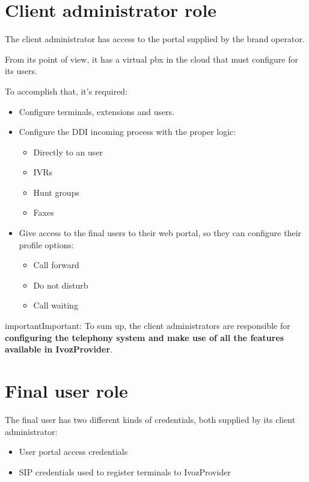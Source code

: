 \documentclass[letterpaper,10pt,english]{sphinxmanual}
\begin{document}
\section{Client administrator role}
\label{basic_concepts/operation_roles/index:client-administrator-role}
The client administrator has access to the portal supplied by the brand
operator.

From its point of view, it has a virtual pbx in the cloud that must
configure for its users.

To accomplish that, it's required:
\begin{itemize}
\item {} 
Configure terminals, extensions and users.

\item {} 
Configure the DDI incoming process with the proper logic:
\begin{itemize}
\item {} 
Directly to an user

\item {} 
IVRs

\item {} 
Hunt groups

\item {} 
Faxes

\end{itemize}

\item {} 
Give access to the final users to their web portal, so they can configure
their profile options:
\begin{itemize}
\item {} 
Call forward

\item {} 
Do not disturb

\item {} 
Call waiting

\end{itemize}

\end{itemize}

\begin{notice}{important}{Important:}
To sum up, the client administrators are responsible for
\textbf{configuring the telephony system and make use of all the
features available in IvozProvider}.
\end{notice}


\section{Final user role}
\label{basic_concepts/operation_roles/index:final-user-role}
The final user has two different kinds of credentials, both supplied by
its client administrator:
\begin{itemize}
\item {} 
User portal access credentials

\item {} 
SIP credentials used to register terminals to IvozProvider

\end{itemize}
\end{document}
